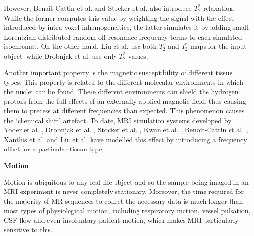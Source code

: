 \hfill

However, Benoit-Cattin et al. \cite{Benoit-Cattin2005} 
and Stocker et al. \cite{Stocker2010} also introduce $T_2^*$ relaxation.
While the former computes this value by weighting the signal with the effect introduced by intra-voxel inhomogeneities, the latter simulates it by adding small Lorentzian distributed random off-resonance frequency terms to each simulated isochromat.
On the other hand, Liu et al. \cite{Liu2014} use both $T_2$ and $T_2^*$ maps for the input object, while 
Drobnjak et al. \cite{Drobnjak2006} use only $T_2^*$ values.
 
\hfill

Another important property is the magnetic susceptibility of different tissue types.
This property is related to the different molecular environments in which the nuclei can be found.
These different environments can shield the hydrogen protons from the full effects of an externally applied magnetic field, thus causing them to precess at different frequencies than expected.
This phenomenon causes the `chemical shift' artefact.
To date, MRI simulation systems developed by
Yoder et al. \cite{Yoder2004}, 
Drobnjak et al. \cite{Drobnjak2006}, 
Stocker et al. \cite{Stocker2010}, 
Kwan et al. \cite{Kwan1999}, 
Benoit-Cattin et al. \cite{Benoit-Cattin2005}, 
Xanthis et al. \cite{Xanthis2014} and 
Liu et al. \cite{Liu2013} 
have modelled this effect by 
introducing a frequency offset for a particular tissue type.



\hfill

\large \textbf{Motion} \normalsize

Motion is ubiquitous to any real life object and so the sample being imaged in an MRI experiment is never completely stationary.
Moreover, the time required for the majority of MR sequences to collect the necessary data is much longer than most types of physiological motion, including respiratory motion, vessel pulsation, CSF flow and even involuntary patient motion, which makes MRI particularly sensitive to this.

